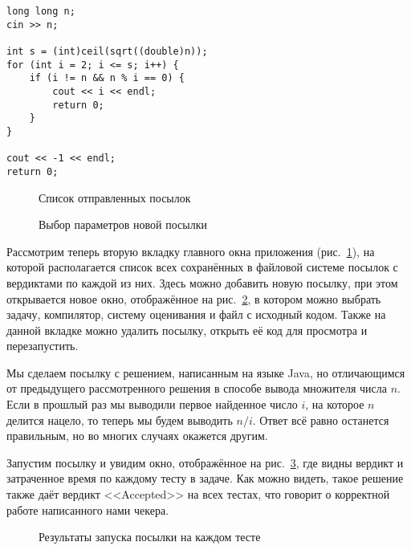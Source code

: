 {\small
\begin{verbatim}
long long n;
cin >> n;

int s = (int)ceil(sqrt((double)n));
for (int i = 2; i <= s; i++) {
    if (i != n && n % i == 0) {
        cout << i << endl;
        return 0;
    }
}

cout << -1 << endl;
return 0;
\end{verbatim}
}

\begin{figure}[!b]
\caption{Список отправленных посылок}
\label{screen_submissions}
\end{figure}

\begin{figure}[!b]
\caption{Выбор параметров новой посылки}
\label{screen_new_submission}
\end{figure}

Рассмотрим теперь вторую вкладку главного окна приложения (рис.~\ref{screen_submissions}), на которой располагается список всех сохранённых в файловой системе посылок с вердиктами по каждой из них. Здесь можно добавить новую посылку, при этом открывается новое окно, отображённое на рис.~\ref{screen_new_submission}, в котором можно выбрать задачу, компилятор, систему оценивания и файл с исходный кодом. Также на данной вкладке можно удалить посылку, открыть её код для просмотра и перезапустить.

Мы сделаем посылку с решением, написанным на языке Java, но отличающимся от предыдущего рассмотренного решения в способе вывода множителя числа $n$. Если в прошлый раз мы выводили первое найденное число $i$, на которое $n$ делится нацело, то теперь мы будем выводить $n/i$. Ответ всё равно останется правильным, но во многих случаях окажется другим.

Запустим посылку и увидим окно, отображённое на рис.~\ref{screen_submission_results}, где видны вердикт и затраченное время по каждому тесту в задаче. Как можно видеть, такое решение также даёт вердикт <<Accepted>> на всех тестах, что говорит о корректной работе написанного нами чекера.

\begin{figure}[!h]
\caption{Результаты запуска посылки на каждом тесте}
\label{screen_submission_results}
\end{figure}